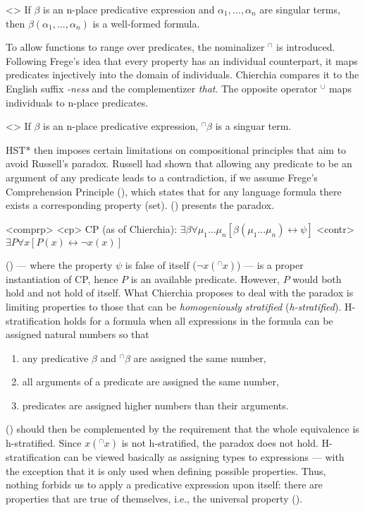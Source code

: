 \documentclass[a4paper, 12pt]{article}
\begin{document}
\ex<>
    If $\beta$ is an n-place predicative expression and $\alpha_1,...,\alpha_n$ are singular terms, then $\beta(\alpha_1,...,\alpha_n)$ is a well-formed formula.
\xe

To allow functions to range over predicates, the nominalizer $^\cap$ is introduced. Following Frege's idea that every property has an individual counterpart, it maps predicates injectively into the domain of individuals. Chierchia compares it to the English suffix \textit{-ness} and the complementizer \textit{that}. The opposite operator $^\cup $ maps individuals to n-place predicates.

\ex<>
    If $\beta$ is an n-place predicative expression, $^\cap\beta$ is a singuar term.
\xe

HST* then imposes certain limitations on compositional principles that aim to avoid Russell's paradox. Russell had shown that allowing any predicate to be an argument of any predicate leads to a contradiction, if we assume Frege's Comprehension Principle (), which states that for any language formula there exists a corresponding property (set). () presents the paradox.

\pex<comprp>
    \a<cp> CP (as of Chierchia): $\exists \beta\forall\mu_1\dots\mu_n[\beta(\mu_1\dots\mu_n)\leftrightarrow \psi]$
    \a<contr> $\exists P \forall x[P(x)\leftrightarrow \neg x(x)]$
\xe

() --- where the property $\psi$ is false of itself ($\neg x(^\cap x)$) --- is a proper instantiation of CP, hence $P$ is an available predicate. However, $P$ would both hold and not hold of itself. What Chierchia proposes to deal with the paradox is limiting properties to those that can be \emph{homogeniously stratified} (\emph{h-stratified}). H-stratification holds for a formula when all expressions in the formula can be assigned natural numbers so that

\begin{enumerate}
    \item any predicative $\beta$ and $^\cap\beta$ are assigned the same number,
    \item all arguments of a predicate are assigned the same number,
    \item predicates are assigned higher numbers than their arguments.
\end{enumerate}

() should then be complemented by the requirement that the whole equivalence is h-stratified. Since $x(^\cap x)$ is not h-stratified, the paradox does not hold. H-stratification can be viewed basically as assigning types to expressions --- with the exception that it is only used when defining possible properties. Thus, nothing forbids us to apply a predicative expression upon itself: there are properties that are true of themselves, i.e., the universal property (\nextx).
\end{document}
